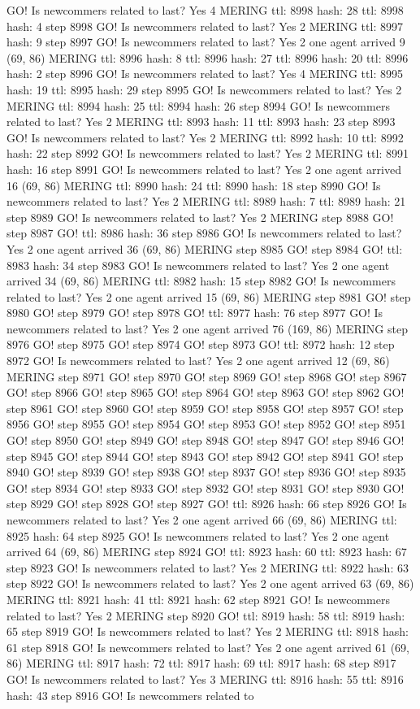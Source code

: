 GO! Is newcommers related to last? Yes 4 MERING ttl: 8998 hash: 28 ttl: 8998 hash: 4 step 8998 GO! Is newcommers related to last? Yes 2 MERING ttl: 8997 hash: 9 step 8997 GO! Is newcommers related to last? Yes 2 one agent arrived 9 (69, 86) MERING ttl: 8996 hash: 8 ttl: 8996 hash: 27 ttl: 8996 hash: 20 ttl: 8996 hash: 2 step 8996 GO! Is newcommers related to last? Yes 4 MERING ttl: 8995 hash: 19 ttl: 8995 hash: 29 step 8995 GO! Is newcommers related to last? Yes 2 MERING ttl: 8994 hash: 25 ttl: 8994 hash: 26 step 8994 GO! Is newcommers related to last? Yes 2 MERING ttl: 8993 hash: 11 ttl: 8993 hash: 23 step 8993 GO! Is newcommers related to last? Yes 2 MERING ttl: 8992 hash: 10 ttl: 8992 hash: 22 step 8992 GO! Is newcommers related to last? Yes 2 MERING ttl: 8991 hash: 16 step 8991 GO! Is newcommers related to last? Yes 2 one agent arrived 16 (69, 86) MERING ttl: 8990 hash: 24 ttl: 8990 hash: 18 step 8990 GO! Is newcommers related to last? Yes 2 MERING ttl: 8989 hash: 7 ttl: 8989 hash: 21 step 8989 GO! Is newcommers related to last? Yes 2 MERING step 8988 GO! step 8987 GO! ttl: 8986 hash: 36 step 8986 GO! Is newcommers related to last? Yes 2 one agent arrived 36 (69, 86) MERING step 8985 GO! step 8984 GO! ttl: 8983 hash: 34 step 8983 GO! Is newcommers related to last? Yes 2 one agent arrived 34 (69, 86) MERING ttl: 8982 hash: 15 step 8982 GO! Is newcommers related to last? Yes 2 one agent arrived 15 (69, 86) MERING step 8981 GO! step 8980 GO! step 8979 GO! step 8978 GO! ttl: 8977 hash: 76 step 8977 GO! Is newcommers related to last? Yes 2 one agent arrived 76 (169, 86) MERING step 8976 GO! step 8975 GO! step 8974 GO! step 8973 GO! ttl: 8972 hash: 12 step 8972 GO! Is newcommers related to last? Yes 2 one agent arrived 12 (69, 86) MERING step 8971 GO! step 8970 GO! step 8969 GO! step 8968 GO! step 8967 GO! step 8966 GO! step 8965 GO! step 8964 GO! step 8963 GO! step 8962 GO! step 8961 GO! step 8960 GO! step 8959 GO! step 8958 GO! step 8957 GO! step 8956 GO! step 8955 GO! step 8954 GO! step 8953 GO! step 8952 GO! step 8951 GO! step 8950 GO! step 8949 GO! step 8948 GO! step 8947 GO! step 8946 GO! step 8945 GO! step 8944 GO! step 8943 GO! step 8942 GO! step 8941 GO! step 8940 GO! step 8939 GO! step 8938 GO! step 8937 GO! step 8936 GO! step 8935 GO! step 8934 GO! step 8933 GO! step 8932 GO! step 8931 GO! step 8930 GO! step 8929 GO! step 8928 GO! step 8927 GO! ttl: 8926 hash: 66 step 8926 GO! Is newcommers related to last? Yes 2 one agent arrived 66 (69, 86) MERING ttl: 8925 hash: 64 step 8925 GO! Is newcommers related to last? Yes 2 one agent arrived 64 (69, 86) MERING step 8924 GO! ttl: 8923 hash: 60 ttl: 8923 hash: 67 step 8923 GO! Is newcommers related to last? Yes 2 MERING ttl: 8922 hash: 63 step 8922 GO! Is newcommers related to last? Yes 2 one agent arrived 63 (69, 86) MERING ttl: 8921 hash: 41 ttl: 8921 hash: 62 step 8921 GO! Is newcommers related to last? Yes 2 MERING step 8920 GO! ttl: 8919 hash: 58 ttl: 8919 hash: 65 step 8919 GO! Is newcommers related to last? Yes 2 MERING ttl: 8918 hash: 61 step 8918 GO! Is newcommers related to last? Yes 2 one agent arrived 61 (69, 86) MERING ttl: 8917 hash: 72 ttl: 8917 hash: 69 ttl: 8917 hash: 68 step 8917 GO! Is newcommers related to last? Yes 3 MERING ttl: 8916 hash: 55 ttl: 8916 hash: 43 step 8916 GO! Is newcommers related to 